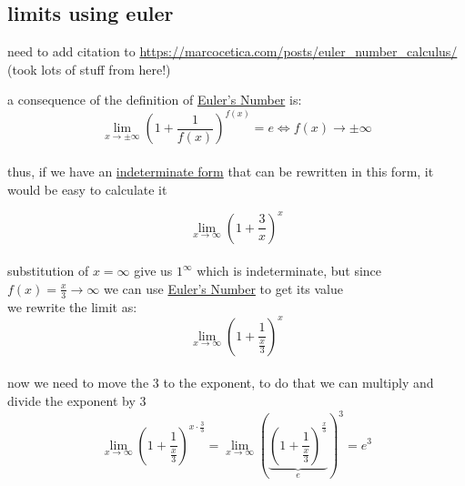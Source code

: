 \documentclass[a4paper,12pt]{article}
\newcommand{\?}{\stackrel{?}{=}}
\begin{document}
\subsection{limits using euler}
\label{sec:org5af9ed3}
\begin{note}
need to add citation to \url{https://marcocetica.com/posts/euler\_number\_calculus/} (took lots of stuff from here!)\\[0pt]
\end{note}
a consequence of the definition of \href{20220704213259-euler_s_number.org}{Euler's Number} is:\\[0pt]
\[
  \lim_{x\to \pm\infty} \left(1+\frac{1}{f(x)}\right)^{f(x)} = e \iff f(x) \to \pm\infty
\]\\[0pt]
thus, if we have an \hyperref[sec:orgd592a44]{indeterminate form} that can be rewritten in this form, it would be easy to calculate it\\[0pt]

\begin{my_example}
\[
  \lim_{x\to \infty} \left(1+\frac{3}{x}\right)^x
\]\\[0pt]
substitution of \(x=\infty\) give us \(1^\infty\) which is indeterminate, but since \(f(x)=\frac{x}{3}\to\infty\) we can use \href{20220704213259-euler_s_number.org}{Euler's Number} to get its value\\[0pt]
we rewrite the limit as:\\[0pt]
\[
  \lim_{x\to\infty} \left(1+\frac{1}{\frac{x}{3}}\right)^x
\]\\[0pt]
now we need to move the 3 to the exponent, to do that we can multiply and divide the exponent by 3\\[0pt]
\[
  \lim_{x\to\infty} \left(1+\frac{1}{\frac{x}{3}}\right)^{x\cdot\frac{3}{3}} = \lim_{x\to\infty} \left(\underbrace{\left(1+\frac{1}{\frac{x}{3}}\right)^{\frac{x}{3}}}_{e}\right)^3 = e^3
\]\\[0pt]
\end{my_example}
\end{document}

